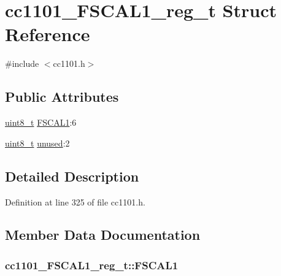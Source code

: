 \hypertarget{structcc1101___f_s_c_a_l1__reg__t}{}\section{cc1101\+\_\+\+F\+S\+C\+A\+L1\+\_\+reg\+\_\+t Struct Reference}
\label{structcc1101___f_s_c_a_l1__reg__t}


{\ttfamily \#include $<$cc1101.\+h$>$}

\subsection*{Public Attributes}
\begin{DoxyCompactItemize}
\item 
\hyperlink{_p_e___types_8h_aba7bc1797add20fe3efdf37ced1182c5}{uint8\+\_\+t} \hyperlink{structcc1101___f_s_c_a_l1__reg__t_a17cca1dee25dc8503de7cfe1f3eabbad}{F\+S\+C\+A\+L1}\+:6
\item 
\hyperlink{_p_e___types_8h_aba7bc1797add20fe3efdf37ced1182c5}{uint8\+\_\+t} \hyperlink{structcc1101___f_s_c_a_l1__reg__t_a8c11ee62b834cb2ff35df318de642d24}{unused}\+:2
\end{DoxyCompactItemize}


\subsection{Detailed Description}


Definition at line 325 of file cc1101.\+h.



\subsection{Member Data Documentation}
\subsubsection[{\texorpdfstring{F\+S\+C\+A\+L1}{FSCAL1}}]{ cc1101\+\_\+\+F\+S\+C\+A\+L1\+\_\+reg\+\_\+t\+::\+F\+S\+C\+A\+L1}\hypertarget{structcc1101___f_s_c_a_l1__reg__t_a17cca1dee25dc8503de7cfe1f3eabbad}{}\label{structcc1101___f_s_c_a_l1__reg__t_a17cca1dee25dc8503de7cfe1f3eabbad}


